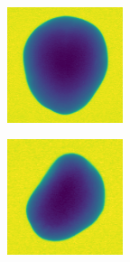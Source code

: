 \documentclass[11pt]{article}
\begin{document}
\begin{figure}[!h]
\begin{subfigure}[b]{0.22\textwidth}
         \caption{}
         \label{fig:perfect_7}
     \end{subfigure}
     \\
    \begin{subfigure}[b]{0.22\textwidth}
         \centering
         \includegraphics[width=\textwidth]{figurer/potato_dataset/perfect/perfect_8.jpg}
         \caption{}
         \label{fig:perfect_8}
     \end{subfigure}
     \hfill
     \begin{subfigure}[b]{0.22\textwidth}
         \centering
         \includegraphics[width=\textwidth]{figurer/potato_dataset/perfect/perfect_9.jpg}

\end{subfigure}
\end{figure}
\end{document}
